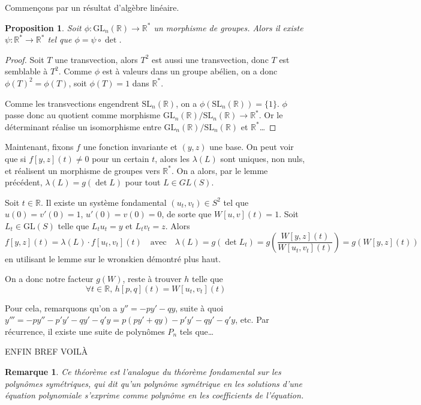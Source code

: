 \documentclass[a4paper, 11pt]{article}
\def\R{\mathbb{R}}
\def\GL{\mathrm{GL}}
\def\SL{\mathrm{SL}}
\newtheorem*{proposition}{Proposition}
\newtheorem*{remark}{Remarque}
\begin{document}
Commençons par un résultat d'algèbre linéaire.

\begin{proposition}
  Soit $\phi : \GL_n(\R) \to \R^*$ un morphisme de groupes. Alors il existe
  $\psi : \R^* \to \R^*$ tel que $\phi = \psi \circ \det$.
\end{proposition}
\begin{proof}
  Soit $T$ une transvection, alors $T^2$ est aussi une transvection, donc $T$ est
  semblable à $T^2$. Comme $\phi$ est à valeurs dans un groupe abélien, on a
  donc $\phi(T)^2 = \phi(T)$, soit $\phi(T) = 1$ dans $\R^*$.

  Comme les transvections engendrent $\SL_n(\R)$, on a $\phi(\SL_n(\R)) =
  \{1\}$. $\phi$ passe donc au quotient comme morphisme $\GL_n(\R)/\SL_n(\R) \to
  \R^*$. Or le déterminant réalise un isomorphisme entre $\GL_n(\R)/\SL_n(\R)$
  et $\R^*$…
\end{proof}

Maintenant, fixons $f$ une fonction invariante et $(y,z)$ une base. On peut voir
que si $f[y,z](t) \neq 0$ pour un certain $t$, alors les $\lambda(L)$ sont
uniques, non nuls, et réalisent un morphisme de groupes vers $\R^*$. On a alors,
par le lemme précédent, $\lambda(L) = g(\det L)$ pour tout $L \in GL(S)$.

Soit $t \in \R$. Il existe un système fondamental $(u_t, v_t) \in S^2$ tel que
$u(0) = v'(0) = 1$, $u'(0) = v(0) = 0$, de sorte que $W[u,v](t) = 1$. Soit $L_t
\in \GL(S)$ telle que $L_tu_t = y$ et $L_tv_t = z$. Alors
\[ f[y,z](t) = \lambda(L) \cdot f[u_t,v_t](t) \quad \text{avec} \quad
  \lambda(L) = g(\det L_t) = g\left( \frac{W[y,z](t)}{W[u_t,v_t](t)} \right)
    = g(W[y,z](t))
\]
en utilisant le lemme sur le wronskien démontré plus haut.

On a donc notre facteur $g(W)$, reste à trouver $h$ telle que
\[ \forall t \in \R,\, h[p,q](t) = W[u_t, v_t](t) \]

Pour cela, remarquons qu'on a $y'' = -py' - qy$, suite à quoi $y''' = -py'' -
p'y' - qy' - q'y = p(py'+qy) - p'y' - qy' - q'y$, etc. Par récurrence, il existe
une suite de polynômes $P_n$ tels que…

ENFIN BREF VOILÀ

\begin{remark}
  Ce théorème est l'analogue du théorème fondamental sur les polynômes
  symétriques, qui dit qu'un polynôme symétrique en les solutions d'une équation
  polynomiale s'exprime comme polynôme en les coefficients de l'équation.
\end{remark}
\end{document}
